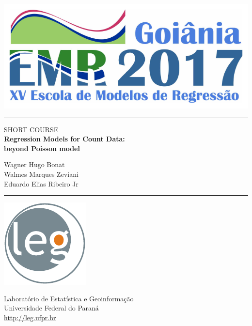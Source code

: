 \documentclass[11pt, a5paper]{book}
\begin{document}
\begin{titlepage}
\thispagestyle{empty}
\centering

\includegraphics[scale=0.7]{./logo-emr}
\vspace*{\fill}

\noindent\rule{\textwidth}{0.4mm}
\vspace*{0.2cm}

{ \LARGE SHORT COURSE\\[0.5cm]

  \textbf{Regression Models for Count Data:\\
  beyond Poisson model}
}

\vspace{1cm}

Wagner Hugo Bonat\\
Walmes Marques Zeviani\\
Eduardo Elias Ribeiro Jr

\vspace*{0.4cm}
\noindent\rule{\textwidth}{0.4mm}

\vspace*{\fill}

\begin{center}
  \begin{minipage}[c]{2.5cm}
    \includegraphics[scale=0.8]{./logo-leg}
  \end{minipage}
  \begin{minipage}[c]{7cm}
    \small
    Laboratório de Estatística e Geoinformação\\
    Universidade Federal do Paraná\\
    \url{http://leg.ufpr.br}
  \end{minipage}
\end{center}

\end{titlepage}
\end{document}
